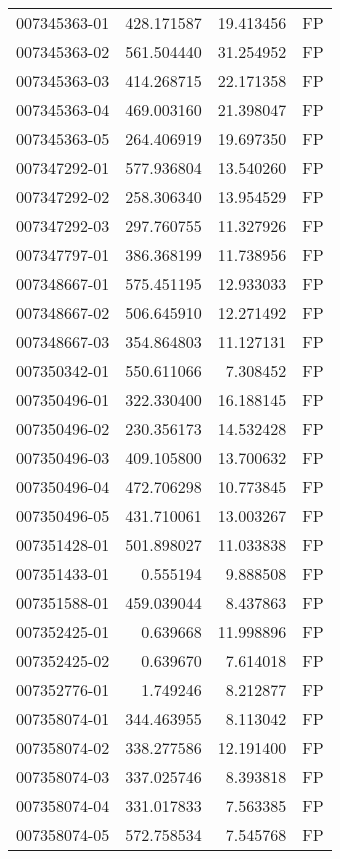 \begin{tabular}{lrrl}
007345363-01 &  428.171587 &    19.413456 &   FP \\
007345363-02 &  561.504440 &    31.254952 &   FP \\
007345363-03 &  414.268715 &    22.171358 &   FP \\
007345363-04 &  469.003160 &    21.398047 &   FP \\
007345363-05 &  264.406919 &    19.697350 &   FP \\
007347292-01 &  577.936804 &    13.540260 &   FP \\
007347292-02 &  258.306340 &    13.954529 &   FP \\
007347292-03 &  297.760755 &    11.327926 &   FP \\
007347797-01 &  386.368199 &    11.738956 &   FP \\
007348667-01 &  575.451195 &    12.933033 &   FP \\
007348667-02 &  506.645910 &    12.271492 &   FP \\
007348667-03 &  354.864803 &    11.127131 &   FP \\
007350342-01 &  550.611066 &     7.308452 &   FP \\
007350496-01 &  322.330400 &    16.188145 &   FP \\
007350496-02 &  230.356173 &    14.532428 &   FP \\
007350496-03 &  409.105800 &    13.700632 &   FP \\
007350496-04 &  472.706298 &    10.773845 &   FP \\
007350496-05 &  431.710061 &    13.003267 &   FP \\
007351428-01 &  501.898027 &    11.033838 &   FP \\
007351433-01 &    0.555194 &     9.888508 &   FP \\
007351588-01 &  459.039044 &     8.437863 &   FP \\
007352425-01 &    0.639668 &    11.998896 &   FP \\
007352425-02 &    0.639670 &     7.614018 &   FP \\
007352776-01 &    1.749246 &     8.212877 &   FP \\
007358074-01 &  344.463955 &     8.113042 &   FP \\
007358074-02 &  338.277586 &    12.191400 &   FP \\
007358074-03 &  337.025746 &     8.393818 &   FP \\
007358074-04 &  331.017833 &     7.563385 &   FP \\
007358074-05 &  572.758534 &     7.545768 &   FP \\

\end{tabular}
